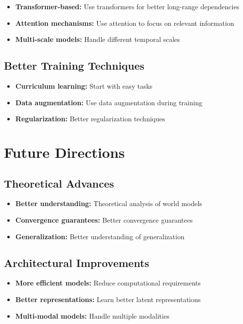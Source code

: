 \begin{itemize}
    \item \textbf{Transformer-based:} Use transformers for better long-range dependencies
    \item \textbf{Attention mechanisms:} Use attention to focus on relevant information
    \item \textbf{Multi-scale models:} Handle different temporal scales
\end{itemize}

\subsection{Better Training Techniques}

\begin{itemize}
    \item \textbf{Curriculum learning:} Start with easy tasks
    \item \textbf{Data augmentation:} Use data augmentation during training
    \item \textbf{Regularization:} Better regularization techniques
\end{itemize}

\section{Future Directions}

\subsection{Theoretical Advances}

\begin{itemize}
    \item \textbf{Better understanding:} Theoretical analysis of world models
    \item \textbf{Convergence guarantees:} Better convergence guarantees
    \item \textbf{Generalization:} Better understanding of generalization
\end{itemize}

\subsection{Architectural Improvements}

\begin{itemize}
    \item \textbf{More efficient models:} Reduce computational requirements
    \item \textbf{Better representations:} Learn better latent representations
    \item \textbf{Multi-modal models:} Handle multiple modalities
\end{itemize}

